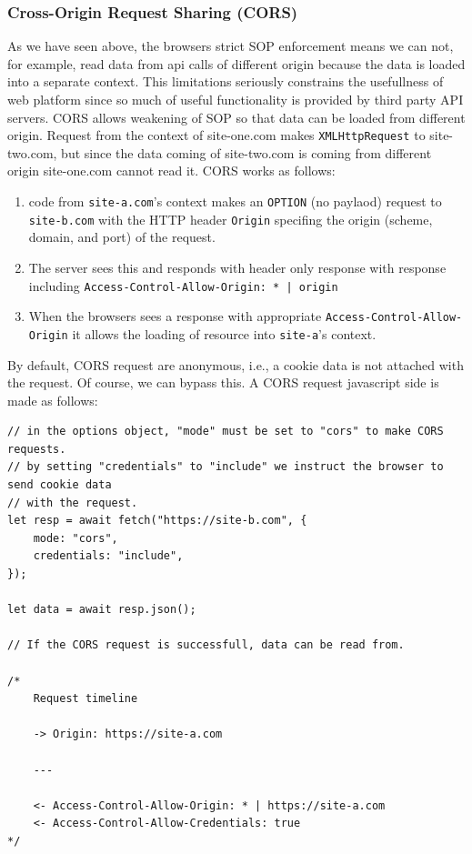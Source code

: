 \documentclass[a4paper]{article}
\begin{document}
\subsubsection*{Cross-Origin Request Sharing (CORS)}

As we have seen above, the browsers strict SOP enforcement means we can not, for example, read data from api calls of different 
origin because the data is loaded into a separate context. This limitations seriously constrains the usefullness of web platform
since so much of useful functionality is provided by third party API servers. CORS allows weakening of SOP so that data can be loaded
from different origin. Request from the context of site-one.com makes \lstinline{XMLHttpRequest} to site-two.com, but since the data 
coming of site-two.com is coming from different origin site-one.com cannot read it. CORS works as follows:

\begin{enumerate}
    \item code from \lstinline{site-a.com}'s context makes an \lstinline{OPTION} (no paylaod) request to \lstinline{site-b.com} with
          the HTTP header \lstinline{Origin} specifing the origin (scheme, domain, and port) of the request.
    \item The server sees this and responds with header only response with response including \lstinline{Access-Control-Allow-Origin: * | origin}
    \item When the browsers sees a response with appropriate \lstinline{Access-Control-Allow-Origin} it allows the loading of
          resource into \lstinline{site-a}'s context.
\end{enumerate}

By default, CORS request are anonymous, i.e., a cookie data is not attached with the request. Of course, we can bypass this.
A CORS request javascript side is made as follows:

\begin{lstlisting}
// in the options object, "mode" must be set to "cors" to make CORS requests.
// by setting "credentials" to "include" we instruct the browser to send cookie data
// with the request.
let resp = await fetch("https://site-b.com", {
    mode: "cors",
    credentials: "include",
});

let data = await resp.json();

// If the CORS request is successfull, data can be read from.

/*
    Request timeline

    -> Origin: https://site-a.com

    ---

    <- Access-Control-Allow-Origin: * | https://site-a.com
    <- Access-Control-Allow-Credentials: true
*/

\end{lstlisting}
\end{document}
